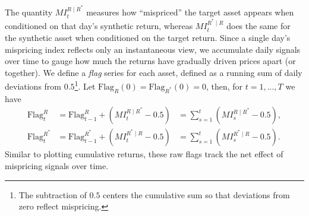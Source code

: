 The quantity $MI_t^{R \mid R^*}$ measures how ``mispriced'' the target asset appears when conditioned on that day's synthetic return, whereas $MI_t^{R^* \mid R}$ does the same for the synthetic asset when conditioned on the target return.
%
Since a single day's mispricing index reflects only an instantaneous view, we accumulate daily signals over time to gauge how much the returns have gradually driven prices apart (or together). We define a \emph{flag} series for each asset, defined as a running sum of daily deviations from $0.5$\footnote{The subtraction of $0.5$ centers the cumulative sum so that deviations from zero reflect mispricing.}. Let $\text{Flag}_{R}(0)=\text{Flag}_{R^*}(0)=0$, then, for $t=1, ..., T$ we have
$$\begin{array}{llll}
\mathrm{Flag}^{R}_{t} 
&= \mathrm{Flag}^{R}_{t-1} + (MI_t^{R \mid R^*} - 0.5)
&=\sum_{s=1}^t (MI_s^{R \mid R^*} - 0.5),
\\[0.2em]
\mathrm{Flag}^{R^*}_{t}
&= \mathrm{Flag}^{R^*}_{t-1} + (MI_t^{R^* \mid R} - 0.5)
&= \sum_{s=1}^t (MI_s^{R^* \mid R} - 0.5)
.
\end{array}$$
Similar to plotting cumulative returns, these raw flags track the net effect of mispricing signals over time. 
%



